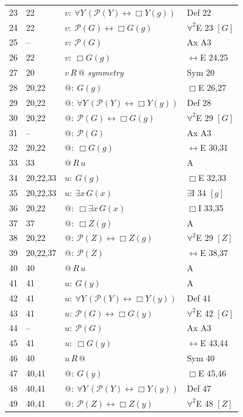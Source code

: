 {\begin{longtable}{@{}r>{\raggedright}p{}p{}>{\raggedright\arraybackslash}p{}@{}}
23 & 22 & $v:\ \forall Y\, (\mathcal{P}(Y) \leftrightarrow \Box Y(g))$ & Def 22\\
24 & 22 & $v:\ \mathcal{P}(G) \leftrightarrow \Box G(g)$ & $\forall^2$E 23 $[G]$\\
25 & -- & $v:\ \mathcal{P}(G)$ & Ax A3\\
26 & 22 & $v:\ \Box G(g)$ & $\leftrightarrow$E 24,25\\
27 & 20 & $v\,R\,@$ \hfill{\itshape symmetry} & Sym 20\\
28 & 20,22 & $@:\ G(g)$ & $\Box$E 26,27\\
29 & 20,22 & $@:\ \forall Y\, (\mathcal{P}(Y) \leftrightarrow \Box Y(g))$ & Def 28\\
30 & 20,22 & $@:\ \mathcal{P}(G) \leftrightarrow \Box G(g)$ & $\forall^2$E 29 $[G]$\\
31 & -- & $@:\ \mathcal{P}(G)$ & Ax A3\\
32 & 20,22 & $@:\ \Box G(g)$ & $\leftrightarrow$E 30,31\\
33 & 33 & $@\,R\,u$ & A\\
34 & 20,22,33 & $u:\ G(g)$ & $\Box$E 32,33\\
35 & 20,22,33 & $u:\ \exists x\, G(x)$ & $\exists$I 34 $[g]$\\
36 & 20,22 & $@:\ \Box \exists x\, G(x)$ & $\Box$I 33,35\\
37 & 37 & $@:\ \Box Z(g)$ & A\\
38 & 20,22 & $@:\ \mathcal{P}(Z) \leftrightarrow \Box Z(g)$ & $\forall^2$E 29 $[Z]$\\
39 & 20,22,37 & $@:\ \mathcal{P}(Z)$ & $\leftrightarrow$E 38,37\\
40 & 40 & $@\,R\,u$ & A\\
41 & 41 & $u:\ G(y)$ & A\\
42 & 41 & $u:\ \forall Y\, (\mathcal{P}(Y) \leftrightarrow \Box Y(y))$ & Def 41\\
43 & 41 & $u:\ \mathcal{P}(G) \leftrightarrow \Box G(y)$ & $\forall^2$E 42 $[G]$\\
44 & -- & $u:\ \mathcal{P}(G)$ & Ax A3\\
45 & 41 & $u:\ \Box G(y)$ & $\leftrightarrow$E 43,44\\
46 & 40 & $u\,R\,@$ & Sym 40\\
47 & 40,41 & $@:\ G(y)$ & $\Box$E 45,46\\
48 & 40,41 & $@:\ \forall Y\, (\mathcal{P}(Y) \leftrightarrow \Box Y(y))$ & Def 47\\
49 & 40,41 & $@:\ \mathcal{P}(Z) \leftrightarrow \Box Z(y)$ & $\forall^2$E 48 $[Z]$\\

\end{longtable}}

